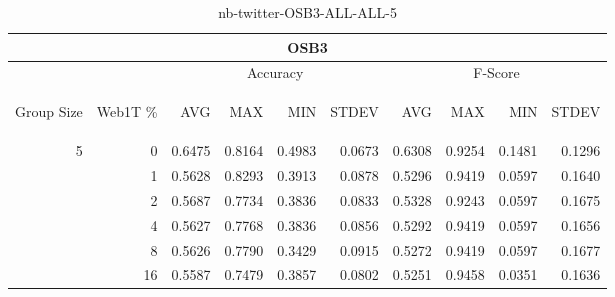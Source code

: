 \begin{center}
\begin{table}[htbp]
\begin{tabular}{ | r | r | r | r | r | r | r | r | r | r |}
\hline
\multicolumn{10}{|c|}{OSB3}\\
\hline
 & & \multicolumn{4}{|c|}{Accuracy} & \multicolumn{4}{|c|}{F-Score}\\ \cline{3-10}
\begin{sideways}Group Size\end{sideways} & \begin{sideways}Web1T \%\end{sideways} & \begin{sideways}AVG\end{sideways} & \begin{sideways}MAX\end{sideways} & \begin{sideways}MIN\end{sideways} & \begin{sideways}STDEV\end{sideways} & \begin{sideways}AVG\end{sideways} & \begin{sideways}MAX\end{sideways} & \begin{sideways}MIN\end{sideways} & \begin{sideways}STDEV\end{sideways}\\
\hline
\multirow{5}{*}{5}
 & 0 & 0.6475 & 0.8164 & 0.4983 & 0.0673 & 0.6308 & 0.9254 & 0.1481 & 0.1296\\ \cline{2-10}
 & 1 & 0.5628 & 0.8293 & 0.3913 & 0.0878 & 0.5296 & 0.9419 & 0.0597 & 0.1640\\ \cline{2-10}
 & 2 & 0.5687 & 0.7734 & 0.3836 & 0.0833 & 0.5328 & 0.9243 & 0.0597 & 0.1675\\ \cline{2-10}
 & 4 & 0.5627 & 0.7768 & 0.3836 & 0.0856 & 0.5292 & 0.9419 & 0.0597 & 0.1656\\ \cline{2-10}
 & 8 & 0.5626 & 0.7790 & 0.3429 & 0.0915 & 0.5272 & 0.9419 & 0.0597 & 0.1677\\ \cline{2-10}
 & 16 & 0.5587 & 0.7479 & 0.3857 & 0.0802 & 0.5251 & 0.9458 & 0.0351 & 0.1636\\ \cline{2-10}
\hline
\end{tabular}
\caption{nb-twitter-OSB3-ALL-ALL-5}
\label{table:nb-twitter-OSB3-ALL-ALL-5}
\end{table}
\end{center}

